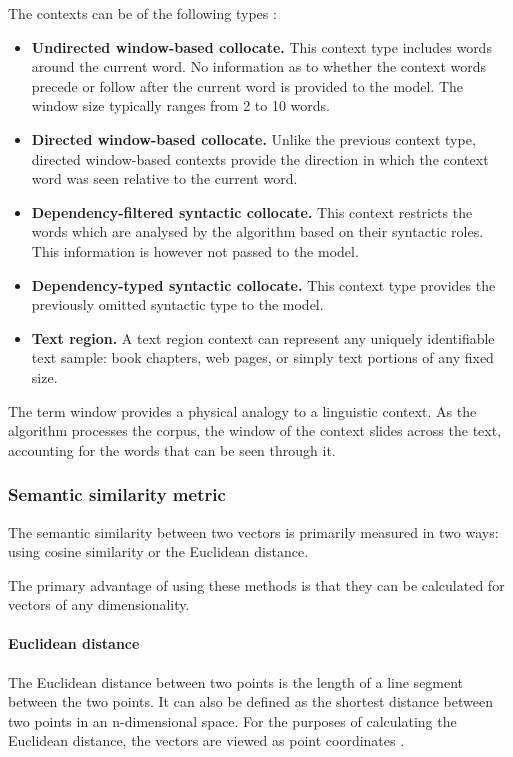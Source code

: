 \documentclass[14pt, a4paper]{extreport}
\begin{document}
The contexts can be of the following types \parencite{lenci}:

\begin{itemize}
  \item \textbf{Undirected window-based collocate.} This context type includes words around the current word. No information as to whether the context words precede or follow after the current word is provided to the model. The window size typically ranges from 2 to 10 words.
  \item \textbf{Directed window-based collocate.} Unlike the previous context type, directed window-based contexts provide the direction in which the context word was seen relative to the current word.
  \item \textbf{Dependency-filtered syntactic collocate.} This context restricts the words which are analysed by the algorithm based on their syntactic roles. This information is however not passed to the model.
  \item \textbf{Dependency-typed syntactic collocate.} This context type provides the previously omitted syntactic type to the model.
  \item \textbf{Text region.} A text region context can represent any uniquely identifiable text sample: book chapters, web pages, or simply text portions of any fixed size.
\end{itemize}

The term window provides a physical analogy to a linguistic context. As the algorithm processes the corpus, the window of the context slides across the text, accounting for the words that can be seen through it.
      \subsubsection{Semantic similarity metric}
The semantic similarity between two vectors is primarily measured in two ways: using cosine similarity or the Euclidean distance.

The primary advantage of using these methods is that they can be calculated for vectors of any dimensionality.

\paragraph{Euclidean distance}

The Euclidean distance between two points is the length of a line segment between the two points. It can also be defined as the shortest distance between two points in an n-dimensional space. For the purposes of calculating the Euclidean distance, the vectors are viewed as point coordinates \parencite{oduntan}.
\end{document}
